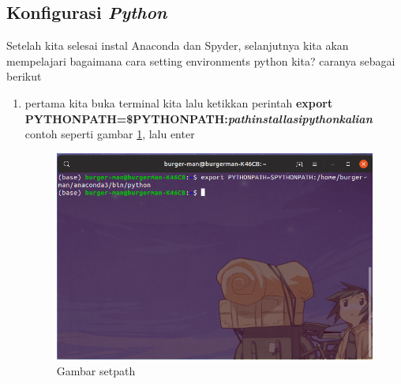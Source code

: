 \subsection{Konfigurasi \textbf{\textit{Python}}}
Setelah kita selesai instal Anaconda dan Spyder, selanjutnya kita akan mempelajari bagaimana cara setting environments python kita? caranya sebagai berikut

\begin{enumerate}

\item pertama kita buka terminal kita lalu ketikkan perintah \textbf{export PYTHONPATH=\$PYTHONPATH:\textit{pathinstallasipythonkalian}} contoh seperti gambar \ref{setpath}, lalu enter
\begin{figure}[H]
\centering
\includegraphics[width=1\textwidth]{figures/ubuntu/setpath.png}
\caption{Gambar setpath}
\label{setpath}
\end{figure}

\end{enumerate}

